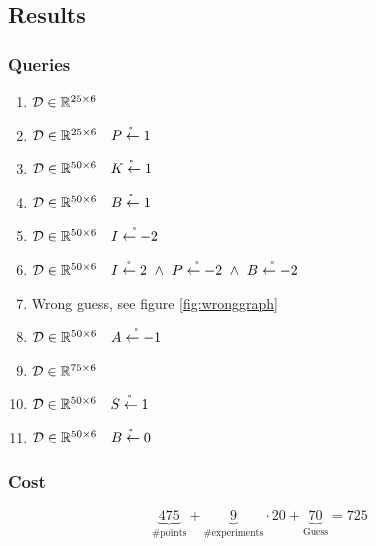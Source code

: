 \documentclass[12pt,fleqn,]{article}
\begin{document}
\begin{multicols}{2}
\section{Results}

\subsubsection*{Queries}
\vspace*{-0.01cm}
\begin{enumerate}[]
	\item \(\mathcal D \in \mathbb R^{25\times 6}\)
	\item \(\mathcal D \in \mathbb R^{25\times 6}\quad \mathring{P\leftarrow1}\) 
	\item \(\mathcal D \in \mathbb R^{50\times 6}\quad \mathring{K\leftarrow1}\) 
	\item \(\mathcal D \in \mathbb R^{50\times 6}\quad \mathring{B\leftarrow1}\) 
	\item \(\mathcal D \in \mathbb R^{50\times 6}\quad \mathring{I\leftarrow-2}\) 
	\item \(\mathcal D \in \RR^{50\times 6}\quad \mathring{I\leftarrow2}\ \wedge\ \mathring{P\leftarrow-2}\ \wedge\ \mathring{B\leftarrow-2}\)
	\item Wrong guess, see figure \ref{fig:wronggraph}

	\item \(\mathcal D \in \mathbb R^{50\times 6}\quad  \mathring{A\leftarrow-1}\) 
	\item \(\mathcal D \in \mathbb R^{75\times 6}\) 
	\item \(\mathcal D \in \mathbb R^{50\times 6}\quad  \mathring{S\leftarrow1}\)
	\item \(\mathcal D \in \mathbb R^{50\times 6}\quad  \mathring{B\leftarrow0}\) 
\end{enumerate}
\vspace*{-0.6cm}
\subsubsection*{Cost}
\[
\underbrace{475}_{\text{\# points}} + \underbrace {9}_ {\text{\# experiments}} \cdot 20 +\underbrace{70}_{\text{Guess}}=725
\]


\end{multicols}
\end{document}
